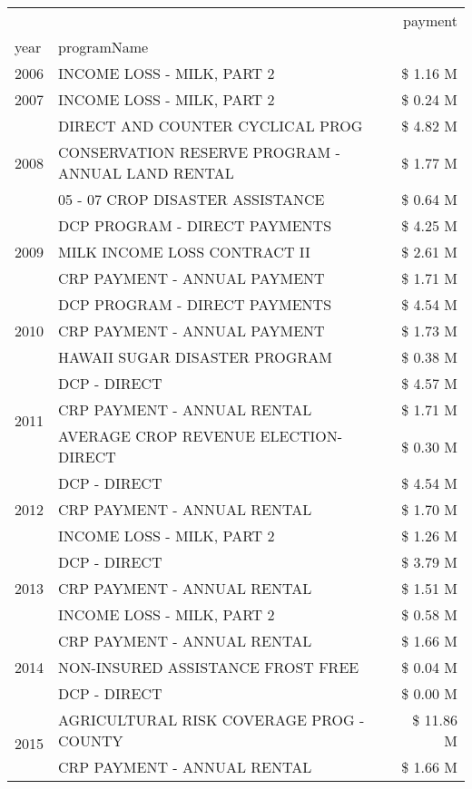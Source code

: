 \begin{tabular}{llr}
\toprule
 &  & payment \\
year & programName &  \\
\midrule
2006 & INCOME LOSS - MILK, PART 2 & \$ 1.16 M \\
\cline{1-3}
2007 & INCOME LOSS - MILK, PART 2 & \$ 0.24 M \\
\cline{1-3}
\multirow[t]{3}{*}{2008} & DIRECT AND COUNTER CYCLICAL PROG & \$ 4.82 M \\
 & CONSERVATION RESERVE PROGRAM - ANNUAL LAND RENTAL & \$ 1.77 M \\
 & 05 - 07 CROP DISASTER ASSISTANCE & \$ 0.64 M \\
\cline{1-3}
\multirow[t]{3}{*}{2009} & DCP PROGRAM - DIRECT PAYMENTS & \$ 4.25 M \\
 & MILK INCOME LOSS CONTRACT II & \$ 2.61 M \\
 & CRP PAYMENT - ANNUAL PAYMENT & \$ 1.71 M \\
\cline{1-3}
\multirow[t]{3}{*}{2010} & DCP PROGRAM - DIRECT PAYMENTS & \$ 4.54 M \\
 & CRP PAYMENT - ANNUAL PAYMENT & \$ 1.73 M \\
 & HAWAII SUGAR DISASTER PROGRAM & \$ 0.38 M \\
\cline{1-3}
\multirow[t]{3}{*}{2011} & DCP - DIRECT & \$ 4.57 M \\
 & CRP PAYMENT - ANNUAL RENTAL & \$ 1.71 M \\
 & AVERAGE CROP REVENUE ELECTION-DIRECT & \$ 0.30 M \\
\cline{1-3}
\multirow[t]{3}{*}{2012} & DCP - DIRECT & \$ 4.54 M \\
 & CRP PAYMENT - ANNUAL RENTAL & \$ 1.70 M \\
 & INCOME LOSS - MILK, PART 2 & \$ 1.26 M \\
\cline{1-3}
\multirow[t]{3}{*}{2013} & DCP - DIRECT & \$ 3.79 M \\
 & CRP PAYMENT - ANNUAL RENTAL & \$ 1.51 M \\
 & INCOME LOSS - MILK, PART 2 & \$ 0.58 M \\
\cline{1-3}
\multirow[t]{3}{*}{2014} & CRP PAYMENT - ANNUAL RENTAL & \$ 1.66 M \\
 & NON-INSURED ASSISTANCE FROST FREE & \$ 0.04 M \\
 & DCP - DIRECT & \$ 0.00 M \\
\cline{1-3}
\multirow[t]{3}{*}{2015} & AGRICULTURAL RISK COVERAGE PROG - COUNTY & \$ 11.86 M \\
 & CRP PAYMENT - ANNUAL RENTAL & \$ 1.66 M \\

\end{tabular}
